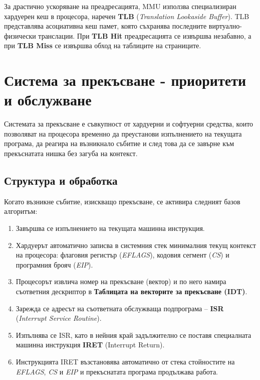 \documentclass{scrartcl}
\begin{document}
\begin{FlushLeft}
За драстично ускоряване на преадресацията, MMU използва специализиран хардуерен кеш в процесора, наречен \textbf{TLB} (\textit{Translation Lookaside Buffer}). TLB представлява асоциативна кеш памет, която съхранява последните виртуално-физически транслации. При \textbf{TLB Hit} преадресацията се извършва незабавно, а при \textbf{TLB Miss} се извършва обход на таблиците на страниците.

\section{Система за прекъсване - приоритети и обслужване}

Системата за прекъсване е съвкупност от хардуерни и софтуерни средства, които позволяват на процесора временно да преустанови изпълнението на текущата програма, да реагира на възникнало събитие и след това да се завърне към прекъснатата нишка без загуба на контекст.

\subsection{Структура и обработка}
Когато възникне събитие, изискващо прекъсване, се активира следният базов алгоритъм:
\begin{enumerate}
    \item Завършва се изпълнението на текущата машинна инструкция.
    \item Хардуерът автоматично записва в системния стек минималния текущ контекст на процесора: флаговия регистър (\textit{EFLAGS}), кодовия сегмент (\textit{CS}) и програмния брояч (\textit{EIP}).
    \item Процесорът извлича номер на прекъсване (вектор) и по него намира съответния дескриптор в \textbf{Таблицата на векторите за прекъсване (IDT)}.
    \item Зарежда се адресът на съответната обслужваща подпрограма – \textbf{ISR} (\textit{Interrupt Service Routine}).
    \item Изпълнява се ISR, като в нейния край задължително се поставя специалната машинна инструкция \textbf{IRET} (Interrupt Return).
    \item Инструкцията IRET възстановява автоматично от стека стойностите на \textit{EFLAGS}, \textit{CS} и \textit{EIP} и прекъснатата програма продължава работа.
\end{enumerate}


\end{FlushLeft}
\end{document}
